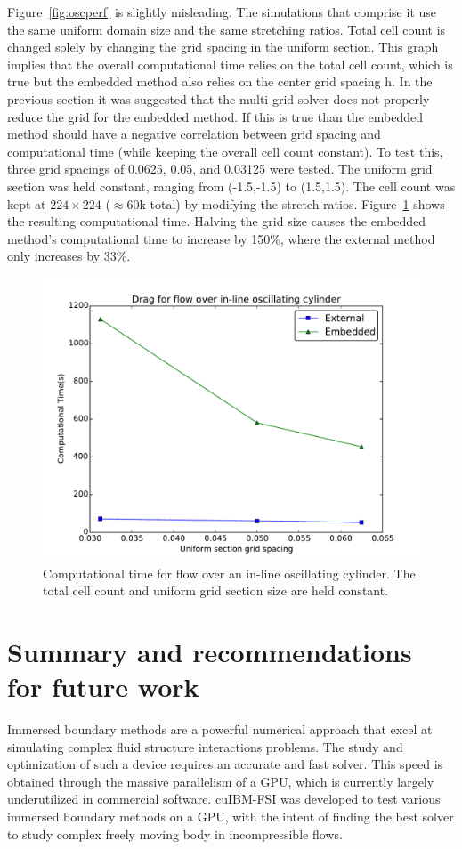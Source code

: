 Figure~\ref{fig:oscperf} is slightly misleading. 
The simulations that comprise it use the same uniform domain size and the same stretching ratios. 
Total cell count is changed solely by changing the grid spacing in the uniform section. 
This graph implies that the overall computational time relies on the total cell count, which is true but the embedded method also relies on the center grid spacing h. 
In the previous section it was suggested that the multi-grid solver does not properly reduce the grid for the embedded method. 
If this is true than the embedded method should have a negative correlation between grid spacing and computational time (while keeping the overall cell count constant). 
To test this, three grid spacings of 0.0625, 0.05, and 0.03125 were tested. 
The uniform grid section was held constant, ranging from (-1.5,-1.5) to (1.5,1.5). 
The cell count was kept at $224\times224$ ($\approx$60k total) by modifying the stretch ratios. 
Figure~\ref{fig:performance2} shows the resulting computational time. 
Halving the grid size causes the embedded method's computational time to increase by 150\%, where the external method only increases by 33\%.
\begin{figure}[!htb]
	\centering
	\includegraphics[width=0.6\linewidth]{performance_oscflow2}
	\caption{Computational time for flow over an in-line oscillating cylinder. The total cell count and uniform grid section size are held constant.}
	\label{fig:performance2}
\end{figure}

\chapter{Summary and recommendations for future work} 
Immersed boundary methods are a powerful numerical approach that excel at simulating complex fluid structure interactions problems. 
The study and optimization of such a device requires an accurate and fast solver. 
This speed is obtained through the massive parallelism of a GPU, which is currently largely underutilized in commercial software. 
cuIBM-FSI was developed to test various immersed boundary methods on a GPU, with the intent of finding the best solver to study complex freely moving body in incompressible flows. 

